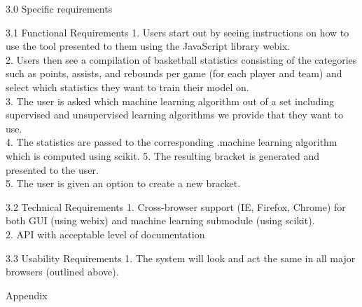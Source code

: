 \documentclass[letterpaper, 10pt,titlepage]{article}
\begin{document}
\begin{section}{3.0 Specific requirements}


\begin{subsection}{3.1 Functional Requirements}
1.	Users start out by seeing instructions on how to use the tool presented to them using the JavaScript library webix. \\
2.	Users then see a compilation of basketball statistics consisting of the categories such as points, assists, and rebounds per game (for each player and team) and select which statistics they want to train their model on. \\
3.   	The user is asked which machine learning algorithm out of a set including supervised and unsupervised learning algorithms we provide that they want to use. \\
4.      The statistics are passed to the corresponding .machine learning algorithm which is computed using scikit. 
5. 	The resulting bracket is generated and presented to the user. \\
5.      The user is given an option to create a new bracket. \\


\end{subsection}

\begin{subsection}{3.2 Technical Requirements}
1.       Cross-browser support (IE, Firefox, Chrome) for both GUI (using webix) and machine learning submodule (using scikit). \\
2.       API with acceptable level of documentation \\


\end{subsection}

\begin{subsection}{3.3 Usability Requirements}
1.       The system will look and act the same in all major browsers (outlined above). \\


\end{subsection}
\end{section}

\newpage

\begin{section}{Appendix}


\end{section}
\end{document}
